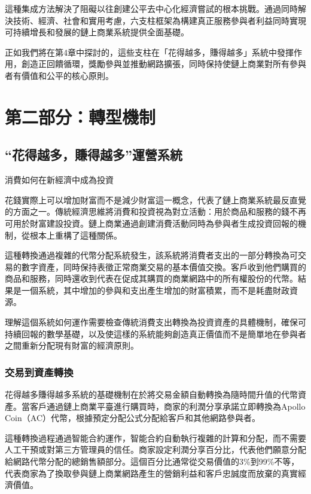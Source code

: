 \documentclass[
  Letterpaper,
]{scrbook}
\begin{document}
這種集成方法解決了阻礙以往創建公平去中心化經濟嘗試的根本挑戰。通過同時解決技術、經濟、社會和實用考慮，六支柱框架為構建真正服務參與者利益同時實現可持續增長和發展的鏈上商業系統提供全面基礎。

正如我們將在第4章中探討的，這些支柱在「花得越多，賺得越多」系統中發揮作用，創造正回饋循環，獎勵參與並推動網路擴張，同時保持使鏈上商業對所有參與者有價值和公平的核心原則。

\part{第二部分：轉型機制}

\chapter{``花得越多，賺得越多''運營系統}\label{sec-spend-earn-system}

消費如何在新經濟中成為投資

花錢實際上可以增加財富而不是減少財富這一概念，代表了鏈上商業系統最反直覺的方面之一。傳統經濟思維將消費和投資視為對立活動：用於商品和服務的錢不再可用於財富建設投資。鏈上商業通過創建消費活動同時為參與者生成投資回報的機制，從根本上重構了這種關係。

這種轉換通過複雜的代幣分配系統發生，該系統將消費者支出的一部分轉換為可交易的數字資產，同時保持表徵正常商業交易的基本價值交換。客戶收到他們購買的商品和服務，同時還收到代表在促成其購買的商業網路中的所有權股份的代幣。結果是一個系統，其中增加的參與和支出產生增加的財富積累，而不是耗盡財政資源。

理解這個系統如何運作需要檢查傳統消費支出轉換為投資資產的具體機制，確保可持續回報的數學基礎，以及使這樣的系統能夠創造真正價值而不是簡單地在參與者之間重新分配現有財富的經濟原則。

\section{交易到資產轉換}\label{ux4ea4ux6613ux5230ux8cc7ux7522ux8f49ux63db}

花得越多賺得越多系統的基礎機制在於將交易金額自動轉換為隨時間升值的代幣資產。當客戶通過鏈上商業平臺進行購買時，商家的利潤分享承諾立即轉換為Apollo
Coin（AC）代幣，根據預定分配公式分配給客戶和其他網路參與者。

這種轉換過程通過智能合約運作，智能合約自動執行複雜的計算和分配，而不需要人工干預或對第三方管理員的信任。商家設定利潤分享百分比，代表他們願意分配給網路代幣分配的總銷售額部分。這個百分比通常從交易價值的3\%到99\%不等，代表商家為了換取參與鏈上商業網路產生的營銷利益和客戶忠誠度而放棄的真實經濟價值。
\end{document}

